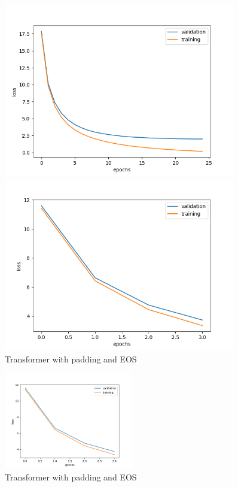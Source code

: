 \documentclass{article}
\begin{document}
\begin{figure}[h]
    \centering
    \begin{minipage}{0.45\textwidth}
        \includegraphics[width=0.9\textwidth]{transformer.png}
        \caption{%
            Transformer.png
        }\label{fig:transformer}
    \end{minipage}
    \begin{minipage}{0.45\textwidth}
        \includegraphics[width=0.9\textwidth]{transformer_padding-eos.png}
        \caption{%
            Transformer with padding and EOS
        }\label{fig:transformerPaddingEOS}
    \end{minipage}


\end{figure}

\begin{figure}[h]
    \centering
    \includegraphics[width=0.5\textwidth]{transformer_padding-eos.png}
    \caption{%
        Transformer with padding and EOS
    }\label{fig:transformerPaddingEOS}
\end{figure}
\end{document}
